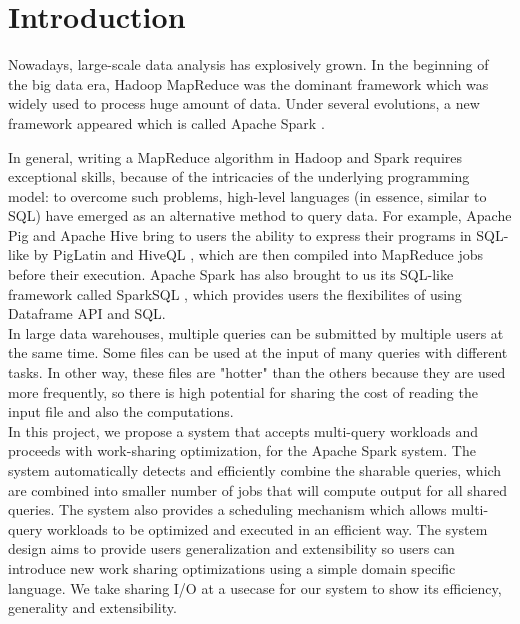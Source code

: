 
\chapter{Introduction} %

\label{Chapter1} %

Nowadays, large-scale data analysis has explosively grown. In the beginning of the big data era, Hadoop MapReduce \cite{hadoop} was the dominant framework which was widely used to process huge amount of data. Under several evolutions, a new framework appeared which is called Apache Spark \cite{spark}.

In general, writing a MapReduce \cite{Dean2004} algorithm in Hadoop and Spark requires exceptional skills, because of the intricacies of the underlying programming model: to overcome such problems, high-level languages (in essence, similar to SQL) have emerged as an alternative method to query data. For example, Apache Pig \cite{Gates2009} \cite{pig} and Apache Hive \cite{ashish2009} \cite{hive} bring to users the ability to express their programs in SQL-like by PigLatin \cite{Olston} and HiveQL \cite{ashish2009} , which are then compiled into MapReduce jobs before their execution. Apache Spark has also brought to us its SQL-like framework called SparkSQL \cite{michaelb}, which provides users the flexibilites of using Dataframe API and SQL.\\

In large data warehouses, multiple queries can be submitted by multiple users at the same time. Some files can be used at the input of many queries with different tasks. In other way, these files are "hotter" than the others because they are used more frequently, so there is high potential for sharing the cost of reading the input file and also the computations.\\

In this project, we propose a system that accepts multi-query workloads and proceeds with work-sharing optimization, for the Apache Spark system. The system automatically detects and efficiently combine the sharable queries, which are combined into smaller number of jobs that will compute output for all shared queries. The system also provides a scheduling mechanism which allows multi-query workloads to be optimized and executed in an efficient way. The system design aims to provide users generalization and extensibility so users can introduce new work sharing optimizations using a simple domain specific language. We take sharing I/O at a usecase for our system to show its efficiency, generality and extensibility.\\

